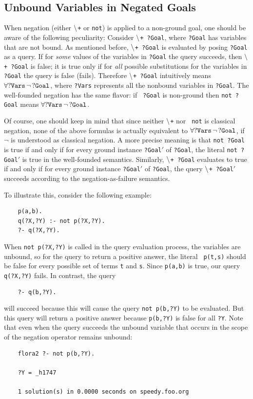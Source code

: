 \documentclass[11pt]{article}
\newcommand{\NAF}{\mbox{\tt \ensuremath{\tt\backslash}+}\xspace}
\newcommand{\TNOT}{{{\tt not}}\xspace}
\begin{document}
\subsection{Unbound Variables in Negated Goals}

When negation (either \NAF or \TNOT) is applied to a non-ground goal, one
should be aware of the following peculiarity: Consider {\tt \NAF\ ?Goal},
where {\tt ?Goal} has variables that are not bound. As mentioned before,
{\tt \NAF\ ?Goal} is evaluated by posing {\tt ?Goal} as a query. If for
\emph{some} values of the variables in {\tt ?Goal} the query succeeds,
then {\tt \NAF\ ?Goal} is false; it is true only if for \emph{all} possible
substitutions for the variables in {\tt ?Goal} the query is false
(fails). Therefore {\tt \NAF\ ?Goal} intuitively means $\tt\forall
?Vars\,\neg\,?Goal$, where {\tt ?Vars} represents all the nonbound variables
in {\tt ?Goal}. The well-founded negation has the same flavor: if {\tt
  ?Goal} is non-ground then {\tt \TNOT\ ?Goal} means $\tt\forall
?Vars\,\neg\,?Goal$.

Of course, one should keep in mind that since neither {\tt \NAF} nor {\tt
  \TNOT} is classical negation, none of the above formulas is actually
equivalent to $\tt\forall ?Vars\,\neg\,?Goal$, if $\neg$ is understood as
classical negation. A more precise meaning is that {\tt \TNOT\ ?Goal} is true
if and only if for every ground instance {\tt ?Goal$'$} of
{\tt ?Goal}, the literal {\tt \TNOT\ ?Goal$'$} is true in
the well-founded semantics.
Similarly, {\tt \NAF\ ?Goal} evaluates to true if and
only if for every ground instance {\tt ?Goal$'$} of  {\tt ?Goal},  the query
{\tt \NAF\ ?Goal$'$} succeeds according to the negation-as-failure
semantics.

To illustrate this, consider the following example:
\begin{verbatim}
    p(a,b).
    q(?X,?Y) :- not p(?X,?Y).
    ?- q(?X,?Y).
\end{verbatim}
When {\tt not p(?X,?Y)} is called in the query evaluation process, the variables
are unbound, so for the query to return a positive answer, the literal {\tt
  p(t,s)} should be false for every possible set of terms {\tt t} and {\tt s}.
Since {\tt p(a,b)} is true, our query {\tt q(?X,?Y)} fails. In contrast, the
query
\begin{verbatim}
    ?- q(b,?Y).  
\end{verbatim}
will succeed because this will cause the query {\tt not p(b,?Y)} to be
evaluated. But this query will return a positive answer because {\tt p(b,?Y)}
is false for all {\tt ?Y}. Note that even when the query succeeds the
unbound variable that occurs in the scope of the negation operator remains
unbound:
\begin{verbatim}
    flora2 ?- not p(b,?Y).  
 
    ?Y = _h1747
 
    1 solution(s) in 0.0000 seconds on speedy.foo.org
\end{verbatim}
\end{document}
